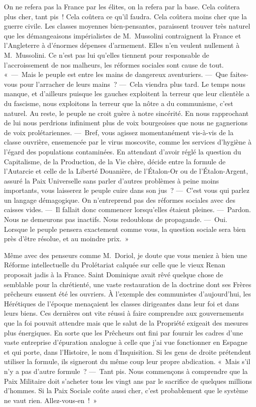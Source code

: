\documentclass[french,twoside]{book} %
\begin{document}
\noindent On ne refera pas la France par les élites, on la refera par la base. Cela coûtera plus cher, tant pis ! Cela coûtera ce qu’il faudra. Cela coûtera moins cher que la guerre civile. Les classes moyennes bien-pensantes, paraissent trouver très naturel que les démangeaisons impérialistes de M. Mussolini contraignent la France et l’Angleterre à d’énormes dépenses d’armement. Elles n’en veulent nullement à M. Mussolini. Ce n’est pas lui qu’elles tiennent pour responsable de l’accroissement de nos malheurs, les réformes sociales sont cause de tout. « — Mais le peuple est entre les mains de dangereux aventuriers. — Que faites-vous pour l’arracher de leurs mains ? — Cela viendra plus tard. Le temps nous manque, et d’ailleurs puisque les gauches exploitent la terreur que leur clientèle a du fascisme, nous exploitons la terreur que la nôtre a du communisme, c’est naturel. Au reste, le peuple ne croit guère à notre sincérité. En nous rapprochant de lui nous perdrions infiniment plus de voix bourgeoises que nous ne gagnerions de voix prolétariennes. — Bref, vous agissez momentanément vis-à-vis de la classe ouvrière, ensemencée par le virus moscovite, comme les services d’hygiène à l’égard des populations contaminées. En attendant d’avoir réglé la question du Capitalisme, de la Production, de la Vie chère, décide entre la formule de l’Autarcie et celle de la Liberté Douanière, de l’Étalon-Or ou de l’Étalon-Argent, assuré la Paix Universelle sans parler d’autres problèmes à peine moins importants, vous laisserez le peuple cuire dans son jus ? — C’est vous qui parlez un langage démagogique. On n’entreprend pas des réformes sociales avec des caisses vides. — Il fallait donc commencer lorsqu’elles étaient pleines. — Pardon. Nous ne demeurons pas inactifs. Nous redoublons de propagande. — Oui. Lorsque le peuple pensera exactement comme vous, la question sociale sera bien près d’être résolue, et au moindre prix. »\par
\bigbreak
\noindent Même avec des penseurs comme M. Doriol, je doute que vous meniez à bien une Réforme intellectuelle du Prolétariat calquée sur celle que le vieux Renan proposait jadis à la France. Saint Dominique avait rêvé quelque chose de semblable pour la chrétienté, une vaste restauration de la doctrine dont ses Frères prêcheurs eussent été les ouvriers. À l’exemple des communistes d’aujourd’hui, les Hérétiques de l’époque menaçaient les classes dirigeantes dans leur foi et dans leurs biens. Ces dernières ont vite réussi à faire comprendre aux gouvernements que la foi pouvait attendre mais que le salut de la Propriété exigeait des mesures plus énergiques. En sorte que les Prêcheurs ont fini par fournir les cadres d’une vaste entreprise d’épuration analogue à celle que j’ai vue fonctionner en Espagne et qui porte, dans l’Histoire, le nom d’Inquisition. Si les gens de droite prétendent utiliser la formule, ils signeront du même coup leur propre abdication. « Mais s’il n’y a pas d’autre formule ? — Tant pis. Nous commençons à comprendre que la Paix Militaire doit s’acheter tous les vingt ans par le sacrifice de quelques millions d’hommes. Si la Paix Sociale coûte aussi cher, c’est probablement que le système ne vaut rien. Allez-vous-en ! »
\end{document}
